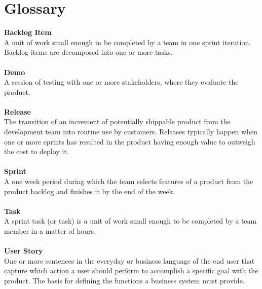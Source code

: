 \documentclass[10pt,a4paper]{report}
\begin{document}
	\section{Glossary}
		\textbf{Backlog Item}\\
		A unit of work small enough to be completed by a team in one sprint iteration. Backlog items are decomposed into one or more tasks. \\
		\\
		\textbf{Demo}\\
		A session of testing with one or more stakeholders, where they evaluate the product.\\
		\\
		\textbf{Release}\\
		The transition of an increment of potentially shippable product from the development team into routine use by customers. Releases typically happen when one or more sprints has resulted in the product having enough value to outweigh the cost to deploy it.\\
		\\
		\textbf{Sprint} \\
		A one week period during which the team selects features of a product from the product backlog and finishes it by the end of the week. \\
		\\
		\textbf{Task} \\
		A sprint task (or task) is a unit of work small enough to be completed by a team member in a matter of hours. \\
		\\
		\textbf{User Story} \\
		One or more sentences in the everyday or business language of the end user that capture which action a user should perform to accomplish a specific goal with the product. The basis for defining the functions a business system must provide.
\end{document}
